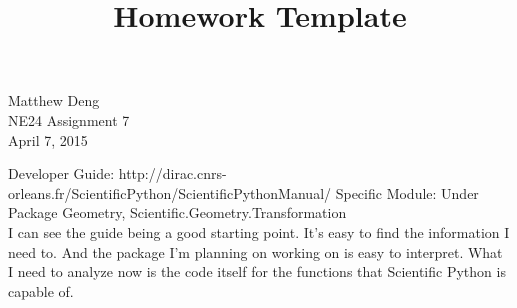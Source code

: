 \documentclass[11pt]{article}
\begin{document}
\def\bs{\textbackslash}
\setlength\parindent{0pt}
\def\reals{\hbox{\rm I\kern-.18em R}}
\def\complexes{\hbox{\rm C\kern-.43em
\vrule depth 0ex height 1.4ex width .05em\kern.41em}}
\def\field{\hbox{\rm I\kern-.18em F}} %
\title{Homework Template}
\setcounter{page}{1}
\begin{flushright}
Matthew Deng \\
NE24 Assignment 7 \\
April 7, 2015
\end{flushright}
\begin{flushleft}
Developer Guide: http://dirac.cnrs-orleans.fr/ScientificPython/ScientificPythonManual/
Specific Module: Under Package Geometry, Scientific.Geometry.Transformation \\


I can see the guide being a good starting point. It's easy to find the information I need to. And the package I'm planning on working on is easy to interpret. What I need to analyze now is the code itself for the functions that Scientific Python is capable of. 



\end{flushleft}
\vspace{1ex}
\end{document}
